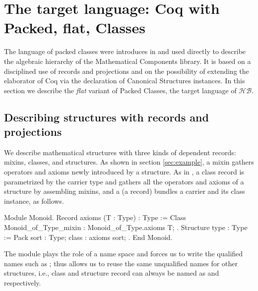 \documentclass[a4paper,UKenglish,cleveref, autoref]{lipics-v2019}
\newcommand{\HB}{\ensuremath{\mathcal{HB}}}
\newcommand{\mixin}{mixin}
\newcommand{\subclass}{subclass}
\newcommand{\join}{\ensuremath{\mathit{join}}}
\theoremstyle{implem}
\theoremstyle{implem}
\theoremstyle{command}
\begin{document}


\section{The target language: Coq with Packed, flat, Classes}
\label{sec:target-lang}

The language of packed classes were introduces in
\cite{DBLP:conf/tphol/GarillotGMR09} and used directly to describe the
algebraic hierarchy of the Mathematical Components library.
It is based on a disciplined use of records and projections and
on the possibility of extending the elaborator of Coq
via the declaration of Canonical Structures instances.
In this section we describe the \emph{flat} variant of
Packed Classes, the target language of \HB{}.

\subsection{Describing structures with records and projections}

We describe mathematical structures with three kinds of dependent records: mixins, classes, and structures.
As shown in section \ref{sec:example}, a \mixin{} gathers operators and axioms newly introduced by a structure.
As in \cite[section 2.4]{DBLP:conf/tphol/GarillotGMR09}\cite[section 2]{KSdraft}, a class record is parametrized by the carrier type  and gathers all the operators and axioms of a structure by assembling mixins, and a  (a record) bundles a carrier and its class instance, as follows.
\begin{coqcode}
Module Monoid.
Record axioms (T : Type) : Type :=
  Class { Monoid_of_Type_mixin : Monoid_of_Type.axioms T; }.
Structure type : Type := Pack { sort : Type; class : axioms sort; }.
End Monoid.
\end{coqcode}
The  module plays the role of a name space and forces us to write the qualified names such as ; thus allows us to reuse the same unqualified names for other structures, i.e., class and structure record can always be named as  and  respectively.
\end{document}
